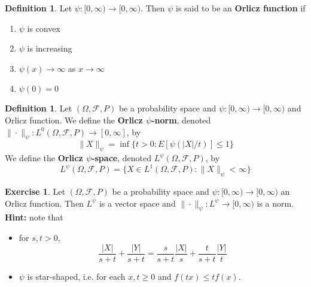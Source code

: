 \documentclass[12pt]{amsart}
\theoremstyle{definition}
\newtheorem{defn}[definition]{Definition}
\newtheorem{ex}[definition]{Exercise}
\newcommand{\Om}{\Omega}
\newcommand{\MF}{\mathcal{F}}
\newcommand{\RG}{[0,\infty]}
\newcommand{\Rg}{[0,\infty)}
\begin{document}
	\begin{defn}
		Let $\psi: \Rg \rightarrow \Rg$. Then $\psi$ is said to be an \textbf{Orlicz function} if 
		\begin{enumerate}
			\item $\psi$ is convex
			\item $\psi$ is increasing
			\item $\psi(x) \rightarrow \infty$ as $x \rightarrow \infty$
			\item $\psi(0) = 0$
		\end{enumerate}
	\end{defn}

	\begin{defn}
		Let $(\Om, \MF, P)$ be a probability space and $\psi: \Rg \rightarrow \Rg$ and Orlicz function. We define the \textbf{Orlicz $\psi$-norm}, denoted $\|\cdot\|_{\psi}: L^0(\Om, \MF, P) \rightarrow \RG$, by 
		$$\|X\|_{\psi} = \inf \{t >0: E [\psi(|X|/t)] \leq 1\}$$
		We define the \textbf{Orlicz $\psi$-space}, denoted $L^{\psi}(\Om, \MF, P)$, by 
		$$L^{\psi}(\Om, \MF, P) = \{X \in L^1(\Om, \MF, P): \|X\|_{\psi} < \infty\}$$
	\end{defn}

	\begin{ex}
		Let $(\Om, \MF, P)$ be a probability space and $\psi: \Rg \rightarrow \Rg$ an Orlicz function. Then $L^{\psi}$ is a vector space and $\|\cdot\|_{\psi}:L^{\psi} \rightarrow \Rg$ is a norm.\\
		\textbf{Hint:} note that
		\begin{itemize}
			\item for $s,t > 0$,
			$$\frac{|X|}{s + t} + \frac{|Y|}{s + t} = \frac{s}{s + t}\frac{|X|}{s} + \frac{t}{s + t}\frac{|Y|}{t}$$
			\item $\psi$ is star-shaped, i.e. for each $x, t \geq 0$ and $f(tx) \leq tf(x)$.
		\end{itemize}
	\end{ex}
\end{document}
